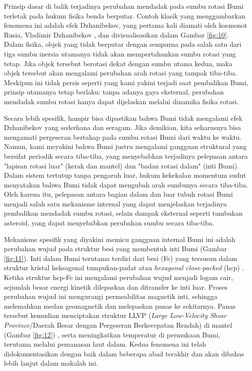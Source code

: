 \documentclass[10pt,twocolumn,letterpaper]{article}
\begin{document}
Prinsip dasar di balik terjadinya perubahan mendadak pada sumbu rotasi Bumi terletak pada hukum fisika benda berputar. Contoh klasik yang menggambarkan fenomena ini adalah efek Dzhanibekov, yang pertama kali diamati oleh kosmonot Rusia, Vladimir Dzhanibekov \cite{37}, dan divisualisasikan dalam Gambar \ref{fig:10}. Dalam fisika, objek yang tidak berputar dengan sempurna pada salah satu dari tiga sumbu inersia utamanya tidak akan mempertahankan sumbu rotasi yang tetap. Jika objek tersebut berotasi dekat dengan sumbu utama kedua, maka objek tersebut akan mengalami perubahan arah rotasi yang tampak tiba-tiba. Meskipun ini tidak persis seperti yang kami yakini terjadi saat pembalikan Bumi, prinsip utamanya tetap berlaku: tanpa adanya gaya eksternal, perubahan mendadak sumbu rotasi hanya dapat dijelaskan melalui dinamika fisika rotasi.

Secara lebih spesifik, hampir bisa dipastikan bahwa Bumi tidak mengalami efek Dzhanibekov yang sederhana dan seragam. Jika demikian, kita seharusnya bisa mengamati pergeseran bertahap pada sumbu rotasi Bumi dari waktu ke waktu. Namun, kami meyakini bahwa Bumi justru mengalami gangguan struktural yang bersifat periodik secara tiba-tiba, yang menyebabkan terjadinya pelepasan antara "lapisan rotasi luar" (kerak dan mantel) dan "badan rotasi dalam" (inti Bumi). Dalam sistem tertutup tanpa pengaruh luar, hukum kekekalan momentum sudut menyatakan bahwa Bumi tidak dapat mengubah arah sumbunya secara tiba-tiba. Oleh karena itu, pelepasan antara bagian dalam dan luar tubuh rotasi Bumi menjadi salah satu mekanisme internal yang dapat menjelaskan terjadinya pembalikan mendadak sumbu rotasi, selain dampak eksternal seperti tumbukan asteroid, yang dapat menyebabkan perubahan sumbu secara tiba-tiba.

Mekanisme spesifik yang diyakini memicu gangguan internal Bumi ini adalah perubahan wujud pada struktur besi yang membentuk inti Bumi (Gambar \ref{fig:11}). Inti dalam Bumi terutama terdiri dari besi (Fe) yang tersusun dalam struktur kristal heksagonal tumpukan-padat atau \textit{hexagonal close-packed} (hcp) \cite{141}. Ketika struktur hcp-Fe ini mengalami perubahan wujud menjadi logam cair, sejumlah besar energi kinetik dilepaskan dan ditransfer ke inti luar. Proses perubahan wujud ini mengurangi permeabilitas magnetik inti, sehingga melemahkan medan geomagnetik dan melepaskan panas ke sekitarnya. Panas tersebut kemudian menciptakan struktur LLVP (\textit{Large Low-Velocity Shear Province}/Daerah Besar dengan Pergeseran Berkecepatan Rendah) di mantel (Gambar \ref{fig:12}) \cite{38}, serta meningkatkan temperatur di permukaan Bumi, terutama melalui pemanasan laut dalam. Kedua fenomena ini telah didokumentasikan dengan baik dalam beberapa abad terakhir dan akan dibahas lebih lanjut dalam makalah ini.
\end{document}
